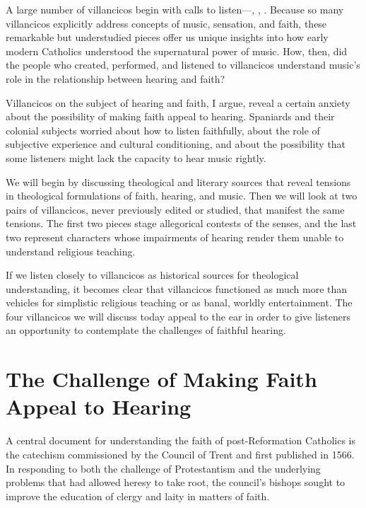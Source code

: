 A large number of villancicos begin with calls to listen---, , .
Because so many villancicos explicitly address concepts of music, sensation, and faith, these remarkable but understudied pieces offer us unique insights into how early modern Catholics understood the supernatural power of music.
How, then, did the people who created, performed, and listened to villancicos understand music's role in the relationship between hearing and faith?

Villancicos on the subject of hearing and faith, I argue, reveal a certain anxiety about the possibility of making faith appeal to hearing.
Spaniards and their colonial subjects worried about how to listen faithfully, about the role of subjective experience and cultural conditioning, and about the possibility that some listeners might lack the capacity to hear music rightly.

We will begin by discussing theological and literary sources that reveal tensions in theological formulations of faith, hearing, and music.
Then we will look at two pairs of villancicos, never previously edited or studied, that manifest the same tensions.
The first two pieces stage allegorical contests of the senses, and the last two represent characters whose impairments of hearing render them unable to understand religious teaching.

If we listen closely to villancicos as historical sources for theological understanding, it becomes clear that villancicos functioned as much more than vehicles for simplistic religious teaching or as banal, worldly entertainment.
The four villancicos we will discuss today appeal to the ear in order to give listeners an opportunity to contemplate the challenges of faithful hearing.

\section{The Challenge of Making Faith Appeal to Hearing}

A central document for understanding the faith of post-Reformation Catholics is the catechism  commissioned by the Council of Trent and first published in 1566.%
\Autocites{Catholic:Catechismus1614}[]{NewCatholic}
In responding to both the challenge of Protestantism and the underlying problems that had allowed heresy to take root, the council's bishops sought to improve the education of clergy and laity in matters of faith.

